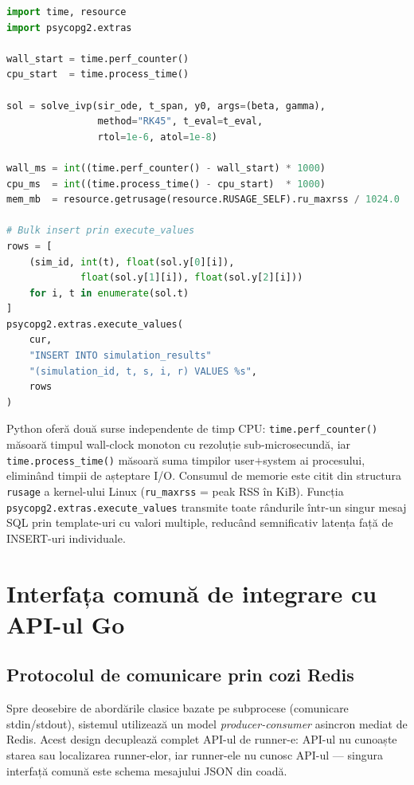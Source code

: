 \begin{lstlisting}[language=Python, caption={Benchmarking și inserare bulk în Python.}]
import time, resource
import psycopg2.extras

wall_start = time.perf_counter()
cpu_start  = time.process_time()

sol = solve_ivp(sir_ode, t_span, y0, args=(beta, gamma),
                method="RK45", t_eval=t_eval,
                rtol=1e-6, atol=1e-8)

wall_ms = int((time.perf_counter() - wall_start) * 1000)
cpu_ms  = int((time.process_time() - cpu_start)  * 1000)
mem_mb  = resource.getrusage(resource.RUSAGE_SELF).ru_maxrss / 1024.0

# Bulk insert prin execute_values
rows = [
    (sim_id, int(t), float(sol.y[0][i]),
             float(sol.y[1][i]), float(sol.y[2][i]))
    for i, t in enumerate(sol.t)
]
psycopg2.extras.execute_values(
    cur,
    "INSERT INTO simulation_results"
    "(simulation_id, t, s, i, r) VALUES %s",
    rows
)
\end{lstlisting}

Python oferă două surse independente de timp CPU: \texttt{time.perf\_counter()}
măsoară timpul wall-clock monoton cu rezoluție sub-microsecundă, iar
\texttt{time.process\_time()} măsoară suma timpilor user$+$system ai
procesului, eliminând timpii de așteptare I/O. Consumul de memorie este
citit din structura \texttt{rusage} a kernel-ului Linux
(\texttt{ru\_maxrss} = peak RSS în KiB). Funcția
\texttt{psycopg2.extras.execute\_values} transmite toate rândurile într-un
singur mesaj SQL prin template-uri cu valori multiple, reducând semnificativ
latența față de INSERT-uri individuale.

\section{Interfața comună de integrare cu API-ul Go}
\label{sec:interfata_integrare}

\subsection{Protocolul de comunicare prin cozi Redis}
\label{subsec:protocol_redis}

Spre deosebire de abordările clasice bazate pe subprocese (comunicare
stdin/stdout), sistemul utilizează un model \emph{producer-consumer} asincron
mediat de Redis. Acest design decuplează complet API-ul de runner-e:
API-ul nu cunoaște starea sau localizarea runner-elor, iar runner-ele nu
cunosc API-ul --- singura interfață comună este schema mesajului JSON din coadă.

